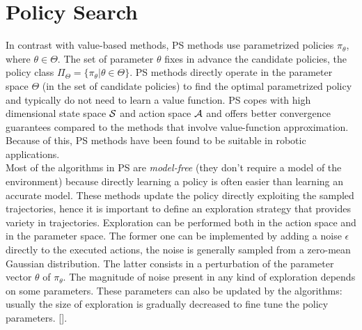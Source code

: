 \section{Policy Search}\label{sec:ps}
In contrast with value-based methods, \acf{PS} methods use parametrized policies $\pi_{\theta}$, where $\theta \in \Theta$. The set of parameter $\theta$ fixes in advance the candidate policies, \ie the policy class $\Pi_{\Theta} = \{ \pi_{\theta} | \theta \in \Theta \}$. \ac{PS} methods directly operate in the parameter space $\Theta$ (\ie in the set of candidate policies) to find the optimal parametrized policy and typically do not need to learn a value function. \ac{PS} copes with high dimensional state space $\mathcal{S}$ and action space $\mathcal{A}$ and offers better convergence guarantees compared to the methods that involve value-function approximation. Because of this, \ac{PS} methods have been found to be suitable in robotic applications.\\
\newline
Most of the algorithms in \ac{PS} are \emph{model-free} (\ie they don't require a model of the environment) because directly learning a policy is often easier than learning an accurate model. These methods update the policy directly exploiting the sampled trajectories, hence it is important to define an exploration strategy that provides variety in trajectories. Exploration can be performed both in the action space and in the parameter space. The former one can be implemented by adding a noise $\epsilon$ directly to the executed actions, the noise is generally sampled from a zero-mean Gaussian distribution. The latter consists in a perturbation of the parameter vector $\theta$ of $\pi_{\theta}$. The magnitude of noise present in any kind of exploration depends on some parameters. These parameters can also be updated by the algorithms: usually the size of exploration is gradually decreased to fine tune the policy parameters. [\citet{deisenroth2013Survey}].

